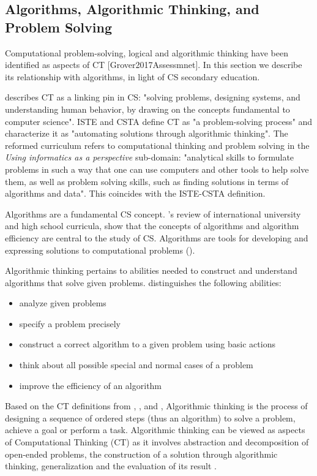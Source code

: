 \subsection{Algorithms, Algorithmic Thinking, and Problem Solving}
Computational problem-solving, logical and algorithmic thinking have been identified as aspects of CT [Grover2017Assessmnet]. In this section we describe its relationship with algorithms, in light of CS secondary education.


 describes CT as a linking pin in CS: "solving problems, designing systems, and understanding human behavior, by drawing on the concepts fundamental to computer science". ISTE and CSTA define CT as "a problem-solving process"\cite{CSTA2011CT} and characterize it as "automating solutions through algorithmic thinking". The reformed curriculum refers to computational thinking and problem solving in the \emph{Using informatics as a perspective} sub-domain: "analytical skills to formulate problems in such a way that one can use computers and other tools to help solve them, as well as problem solving skills,
such as finding solutions in terms of algorithms and data"\cite{Barendsen2016}. This coincides with the ISTE-CSTA definition.




Algorithms are a fundamental CS concept. 's review of international university and high school curricula, show that the concepts of algorithms and algorithm efficiency are central to the study of CS. Algorithms are tools for developing and expressing solutions to computational problems (\cite{GroverPea2013}).


Algorithmic thinking pertains to abilities needed to construct and understand algorithms that solve given problems.  distinguishes the following abilities:
\begin{itemize}
\item analyze given problems
\item specify a problem precisely
\item construct a correct algorithm to a given problem using basic actions
\item think about all possible special and normal cases of a problem
\item improve the efficiency of an algorithm
\end{itemize}
Based on the CT definitions from \cite{CAS2014CT}, \cite{Google2017CT}, \cite{BrennanResnick2012} and \cite{CSTA2011CT}, Algorithmic thinking is the process of designing a sequence of ordered steps (thus an algorithm) to solve a problem, achieve a goal or perform a task\cite{corradini2017conceptions}. Algorithmic thinking can be viewed as aspects of Computational Thinking (CT) as it involves abstraction and decomposition of open-ended problems, the construction of a solution through algorithmic thinking, generalization and the evaluation of its result \cite{Wing2006}.



